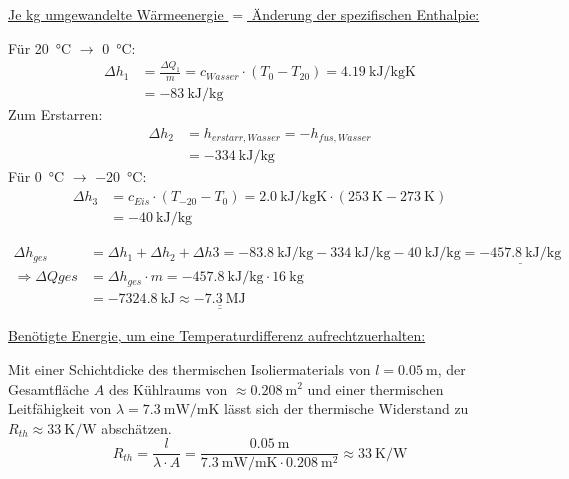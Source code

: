 		\underline{Je kg umgewandelte Wärmeenergie \(=\) Änderung der spezifischen Enthalpie:}\par\medskip
		Für \SI{20}{\celsius} \(\rightarrow\) \SI{0}{\celsius}:
		\begin{align}
			\Delta h_1	&= \frac{\Delta Q_1}{m} = c_{Wasser} \cdot \left(T_0 - T_{20}\right) = \SI{4,19}{\kilo\joule\per\kilo\gram\kelvin}\\%
						&= \SI{-83}{\kilo\joule\per\kilo\gram}
		\end{align}
		Zum Erstarren:
		\begin{align}
			\Delta h_2	&= h_{erstarr,Wasser} = -h_{fus,Wasser} \nonumber \\
						&= \SI{-334}{\kilo\joule\per\kilo\gram}
		\end{align}
		Für \SI{0}{\celsius} \(\rightarrow\) \SI{-20}{\celsius}:
		\begin{align}
			\Delta h_3	&= c_{Eis} \cdot (T_{-20}-T_0) = \SI{2,0}{\kilo\joule\per\kilo\gram\kelvin} \cdot (\SI{253}{\kelvin}-\SI{273}{\kelvin}) \nonumber \\
						&= \SI{-40}{\kilo\joule\per\kilo\gram}
		\end{align}

		\begin{align}
			\Delta h_{ges} 				&= \Delta h_1 + \Delta h_2 + \Delta h3 = \SI{-83,8}{\kilo\joule\per\kilo\gram} - \SI{334}{\kilo\joule\per\kilo\gram} - \SI{40}{\kilo\joule\per\kilo\gram} = \underline{\SI{-457,8}{\kilo\joule\per\kilo\gram}} \nonumber \\
			\Rightarrow \Delta Q{ges} 	&= \Delta h_{ges} \cdot m = \SI{-457,8}{\kilo\joule\per\kilo\gram} \cdot \SI{16}{\kilo\gram} \nonumber \\
										&= \SI{-7324,8}{\kilo\joule} \approx \underline{\underline{\SI{-7,3}{\mega\joule}}}
		\end{align}

		\underline{Benötigte Energie, um eine Temperaturdifferenz aufrechtzuerhalten:}\par\smallskip
		Mit einer Schichtdicke des thermischen Isoliermaterials von \(l = \SI{0,05}{\metre}\), der Gesamtfläche \(A\) des Kühlraums von \(\approx \SI{0,208}{\metre\squared}\)
		und einer thermischen Leitfähigkeit von \(\lambda = \SI{7,3}{\milli\watt\per\metre\kelvin}\) lässt sich der thermische Widerstand zu
		\(R_{th} \approx \SI{33}{\kelvin\per\watt}\) abschätzen.
		\begin{equation}
			R_{th} 	= \frac{l}{\lambda \cdot A} = \frac{\SI{0,05}{\metre}}{\SI{7,3}{\milli\watt\per\metre\kelvin} \cdot \SI{0,208}{\metre\squared}} \approx \SI{33}{\kelvin\per\watt}
		\end{equation}

